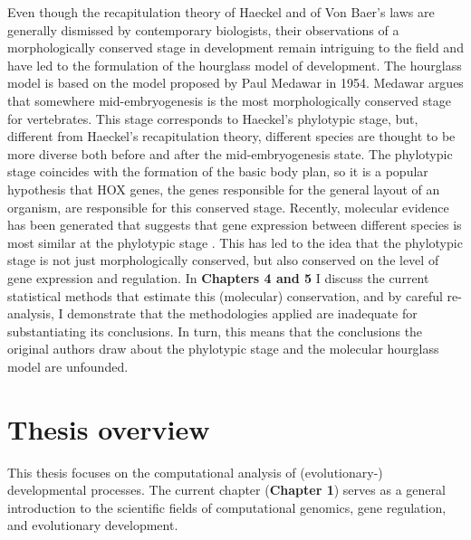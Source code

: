 Even though the recapitulation theory of Haeckel and of Von Baer's laws are generally dismissed by contemporary biologists, their observations of a morphologically conserved stage in development remain intriguing to the field and have led to the formulation of the hourglass model of development. The hourglass model is based on the model proposed by Paul Medawar in 1954\cite{Medawar1954}. Medawar argues that somewhere mid-embryogenesis is the most morphologically conserved stage for vertebrates. This stage corresponds to Haeckel's phylotypic stage, but, different from Haeckel's recapitulation theory, different species are thought to be more diverse both before and after the mid-embryogenesis state. The phylotypic stage coincides with the formation of the basic body plan, so it is a popular hypothesis that HOX genes, the genes responsible for the general layout of an organism, are responsible for this conserved stage\cite{Duboule1994}. Recently, molecular evidence has been generated that suggests that gene expression between different species is most similar at the phylotypic stage \cite{Levin2016,marletaz2018,Mayshar2023,Liu2021,DomazetLoso2010,Irie2011,Kalinka2010,Piasecka2013,Uesaka2019}. This has led to the idea that the phylotypic stage is not just morphologically conserved, but also conserved on the level of gene expression and regulation. In \textbf{Chapters 4 and 5} I discuss the current statistical methods that estimate this (molecular) conservation, and by careful re-analysis, I demonstrate that the methodologies applied are inadequate for substantiating its conclusions. In turn, this means that the conclusions the original authors draw about the phylotypic stage and the molecular hourglass model are unfounded. 

\section{Thesis overview}

This thesis focuses on the computational analysis of (evolutionary-) developmental processes. The current chapter (\textbf{Chapter 1}) serves as a general introduction to the scientific fields of computational genomics, gene regulation, and evolutionary development.  

